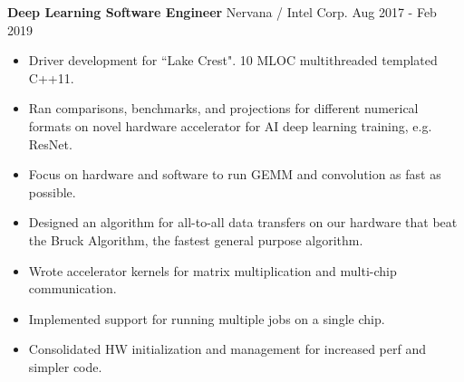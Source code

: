 \textbf{Deep Learning Software Engineer}  Nervana / Intel Corp. \hfill Aug 2017 - Feb 2019

\begin{itemize} \itemsep -2pt

\item Driver development for ``Lake Crest". 10 MLOC multithreaded templated C++11.

\item Ran comparisons, benchmarks, and projections for different numerical formats on novel hardware accelerator
      for AI deep learning training, e.g. ResNet.

\item Focus on hardware and software to run GEMM and convolution as fast as possible.

\item Designed an algorithm for all-to-all data transfers on our hardware that beat the Bruck Algorithm,
      the fastest general purpose algorithm.

\item Wrote accelerator kernels for matrix multiplication and multi-chip communication.

\item Implemented support for running multiple jobs on a single chip.

\item Consolidated HW initialization and management for increased perf and simpler code.

\end{itemize}
